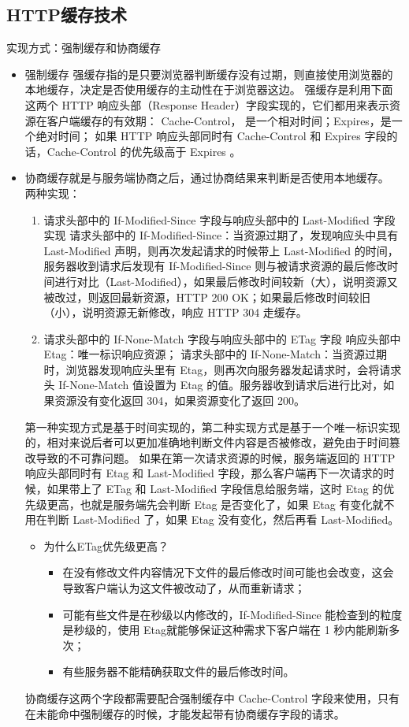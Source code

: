 \documentclass[11pt]{article}
\begin{document}
\subsection{HTTP缓存技术}
\label{sec:org1e48fd0}
实现方式：强制缓存和协商缓存
\begin{itemize}
\item 强制缓存
强缓存指的是只要浏览器判断缓存没有过期，则直接使用浏览器的本地缓存，决定是否使用缓存的主动性在于浏览器这边。
强缓存是利用下面这两个 HTTP 响应头部（Response Header）字段实现的，它们都用来表示资源在客户端缓存的有效期：
Cache-Control， 是一个相对时间；Expires，是一个绝对时间；
如果 HTTP 响应头部同时有 Cache-Control 和 Expires 字段的话，Cache-Control 的优先级高于 Expires 。

\item 协商缓存就是与服务端协商之后，通过协商结果来判断是否使用本地缓存。
两种实现：
\begin{enumerate}
\item 请求头部中的 If-Modified-Since 字段与响应头部中的 Last-Modified 字段实现
请求头部中的 If-Modified-Since：当资源过期了，发现响应头中具有 Last-Modified 声明，则再次发起请求的时候带上 Last-Modified 的时间，服务器收到请求后发现有 If-Modified-Since 则与被请求资源的最后修改时间进行对比（Last-Modified），如果最后修改时间较新（大），说明资源又被改过，则返回最新资源，HTTP 200 OK；如果最后修改时间较旧（小），说明资源无新修改，响应 HTTP 304 走缓存。

\item 请求头部中的 If-None-Match 字段与响应头部中的 ETag 字段
响应头部中 Etag：唯一标识响应资源；
请求头部中的 If-None-Match：当资源过期时，浏览器发现响应头里有 Etag，则再次向服务器发起请求时，会将请求头 If-None-Match 值设置为 Etag 的值。服务器收到请求后进行比对，如果资源没有变化返回 304，如果资源变化了返回 200。
\end{enumerate}
第一种实现方式是基于时间实现的，第二种实现方式是基于一个唯一标识实现的，相对来说后者可以更加准确地判断文件内容是否被修改，避免由于时间篡改导致的不可靠问题。
如果在第一次请求资源的时候，服务端返回的 HTTP 响应头部同时有 Etag 和 Last-Modified 字段，那么客户端再下一次请求的时候，如果带上了 ETag 和 Last-Modified 字段信息给服务端，这时 Etag 的优先级更高，也就是服务端先会判断 Etag 是否变化了，如果 Etag 有变化就不用在判断 Last-Modified 了，如果 Etag 没有变化，然后再看 Last-Modified。
\begin{itemize}
\item 为什么ETag优先级更高？
\begin{itemize}
\item 在没有修改文件内容情况下文件的最后修改时间可能也会改变，这会导致客户端认为这文件被改动了，从而重新请求；
\item 可能有些文件是在秒级以内修改的，If-Modified-Since 能检查到的粒度是秒级的，使用 Etag就能够保证这种需求下客户端在 1 秒内能刷新多次；
\item 有些服务器不能精确获取文件的最后修改时间。
\end{itemize}
\end{itemize}
协商缓存这两个字段都需要配合强制缓存中 Cache-Control 字段来使用，只有在未能命中强制缓存的时候，才能发起带有协商缓存字段的请求。


\end{itemize}
\end{document}
